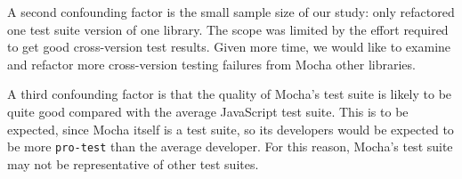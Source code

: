 A second confounding factor is the small sample size of our study:
only refactored one test suite version of one library. The scope was
limited by the effort required to get good cross-version test
results. Given more time, we would like to examine and refactor more
cross-version testing failures from Mocha other libraries.

A third confounding factor is that the quality of Mocha's test suite
is likely to be quite good compared with the average JavaScript test
suite. This is to be expected, since Mocha itself is a test suite, so
its developers would be expected to be more {\tt pro-test} than the
average developer. For this reason, Mocha's test suite may not be
representative of other test suites.

